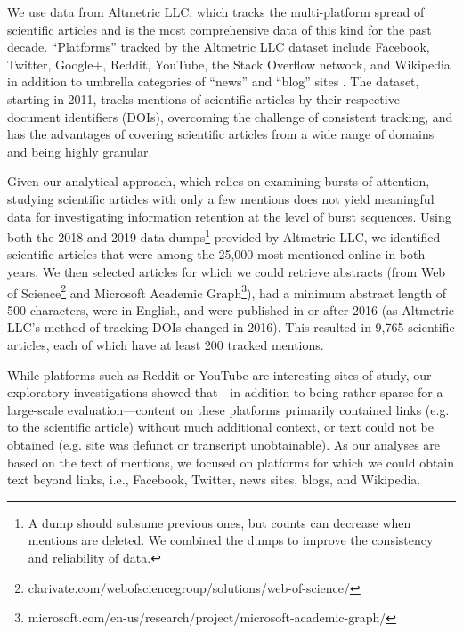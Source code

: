 \documentclass[letterpaper]{article} %
\begin{document}
We use data from Altmetric LLC, which tracks the multi-platform spread of scientific articles and is the most comprehensive data of this kind for the past decade. ``Platforms'' tracked by the Altmetric LLC dataset include Facebook, Twitter, Google+, Reddit, YouTube, the Stack Overflow network, and Wikipedia in addition to umbrella categories of ``news'' and ``blog'' sites \cite{altmetricsupportOurDataOur2021}. The dataset, starting in 2011, tracks mentions of scientific articles by their respective document identifiers (DOIs), overcoming the challenge of consistent tracking, and has the advantages of covering scientific articles from a wide range of domains and being highly granular.

Given our analytical approach, which relies on examining bursts of attention, studying scientific articles with only a few mentions does not yield meaningful data for investigating information retention at the level of burst sequences. Using both the 2018 and 2019 data dumps\footnote{A dump should subsume previous ones, but counts can decrease when mentions are deleted. We combined the dumps to improve the consistency and reliability of data.} provided by Altmetric LLC, we identified scientific articles that were among the 25,000 most mentioned online in both years. We then selected articles for which we could retrieve abstracts (from Web of Science\footnote{clarivate.com/webofsciencegroup/solutions/web-of-science/} and Microsoft Academic Graph\footnote{microsoft.com/en-us/research/project/microsoft-academic-graph/}), had a minimum abstract length of 500 characters, were in English, and were published in or after 2016 (as Altmetric LLC's method of tracking DOIs changed in 2016). This resulted in 9,765 scientific articles, each of which have at least 200 tracked mentions.

While platforms such as Reddit or YouTube are interesting sites of study, our exploratory investigations showed that---in addition to being rather sparse for a large-scale evaluation---content on these platforms primarily contained links (e.g. to the scientific article) without much additional context, or text could not be obtained (e.g. site was defunct or transcript unobtainable). As our analyses are based on the text of mentions, we focused on platforms for which we could obtain text beyond links, i.e., Facebook, Twitter, news sites, blogs, and Wikipedia.
\end{document}
